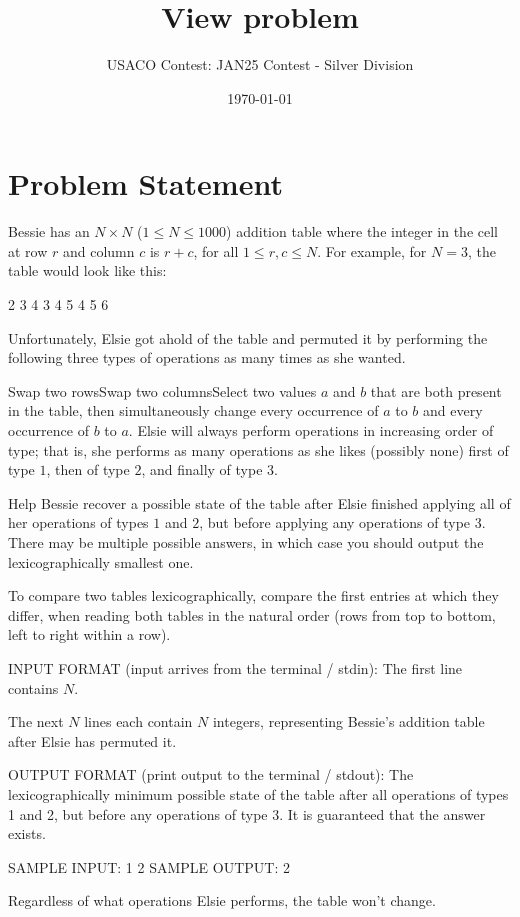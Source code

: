 \documentclass[12pt]{article}
\title{View problem}
\author{USACO Contest: JAN25 Contest - Silver Division}
\date{\today}
\begin{document}
\maketitle

\section*{Problem Statement}


Bessie has an $N\times N$ ($1\le N\le 1000$) addition table where the integer in
the cell at row $r$ and column $c$ is $r+c$, for all $1\le r,c\le N$. For
example, for $N=3$, the table would look like this:


2 3 4
3 4 5
4 5 6

Unfortunately, Elsie got ahold of the table and permuted it by performing the
following three types of operations as many times as she wanted.

Swap two rowsSwap two columnsSelect two values $a$ and $b$ that are both present in the table, then
simultaneously change every occurrence of $a$ to $b$ and every occurrence of $b$
to $a$.
Elsie will always perform operations in increasing order of type; that is, she
performs as many operations as she likes (possibly none) first of type $1$, then
of type $2$, and finally of type $3$.

Help Bessie recover a possible state of the table after Elsie finished applying
all of her operations of types $1$ and $2$, but before applying any operations
of type $3$. There may be multiple possible answers, in which case you should
output the lexicographically smallest one.

To compare two tables lexicographically, compare the first entries at which they
differ, when reading both tables in the natural order (rows from top to bottom,
left to right within a row).

INPUT FORMAT (input arrives from the terminal / stdin):
The first line contains $N$.

The next $N$ lines each contain $N$ integers, representing Bessie's addition
table after Elsie has permuted it.

OUTPUT FORMAT (print output to the terminal / stdout):
The lexicographically minimum possible state of the table after all operations
of types 1 and 2, but before any operations of type 3. It is guaranteed that the
answer exists.

SAMPLE INPUT:
1
2
SAMPLE OUTPUT: 
2

Regardless of what operations Elsie performs, the table won't change.
\end{document}
